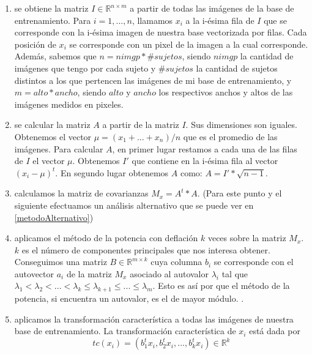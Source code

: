 \begin{enumerate}
 \item se obtiene la matriz $I\in\mathbb{R}^{n \times m}$ a partir de todas las imágenes de la base de entrenamiento. Para $i = 1,...,n$, llamamos $x_i$ a
 la i-ésima fila de $I$ que se corresponde con la i-ésima imagen de nuestra base vectorizada por filas. Cada posición de $x_i$ se 
 corresponde con un pixel de la imagen a la cual corresponde. Además, sabemos que $n = nimgp * \#sujetos$, siendo $nimgp$ la cantidad de imágenes
 que tengo por cada sujeto y $\#sujetos$ la cantidad de sujetos distintos a los que pertencen las imágenes de mi base de entrenamiento, y 
 $m = alto * ancho$, siendo $alto$ y $ancho$ los respectivos anchos y altos de las imágenes medidos en pixeles.
 
 \item se calcular la matriz $A$ a partir de la matriz $I$. Sus dimensiones son iguales. Obtenemos el vector $\mu = (x_1+...+x_n)/n$ que es 
 el promedio de las imágenes. Para calcular $A$, en primer lugar restamos a cada una de las filas de $I$ el vector $\mu$. Obtenemos $I'$ que contiene en la
 i-ésima fila al vector $(x_i - \mu)^t$. En segundo lugar obtenemos $A$ como: $A = I' * \sqrt{n-1}$.
 
 \item calculamos la matriz de covarianzas $M_x = A^t*A$. (Para este punto y el siguiente efectuamos un análisis alternativo que se puede ver en \ref{metodoAlternativo})
 
 \item aplicamos el método de la potencia con deflación $k$ veces sobre la matriz $M_x$. $k$ es el número de componentes principales que nos 
 interesa obtener. Conseguimos una matriz $B\in\mathbb{R}^{m \times k}$ cuya columna $b_i$ se corresponde con el autovector $a_i$ de la matriz
 $M_x$ asociado al autovalor $\lambda_i$ tal que $\lambda_1 < \lambda_2 < ... < \lambda_k \leq \lambda_{k+1} \leq ... \leq \lambda_m$. Esto es así
 por que el método de la potencia, si encuentra un autovalor, es el de mayor módulo. \cite{burden}.
 
 \item aplicamos la transformación característica a todas las imágenes de nuestra base de entrenamiento. La transformación característica
 de $x_i$ está dada por \begin{displaymath}
			    tc(x_i) = ({b_1^t}x_i, {b_2^t}x_i,..., {b_k^t}x_i)\in\mathbb{R}^k
                        \end{displaymath}
\end{enumerate}
